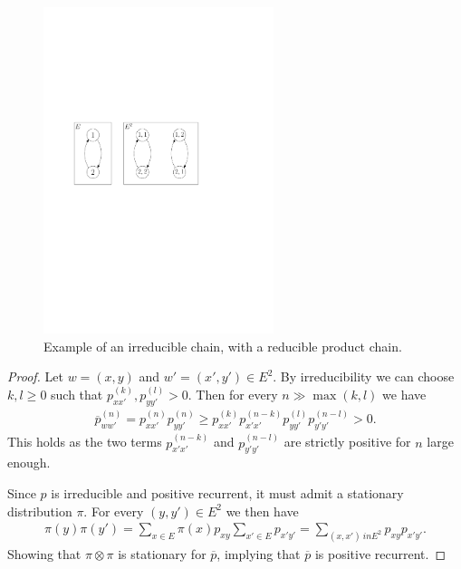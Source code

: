 \begin{figure}[h!]
\centering
\includegraphics[width=0.6\textwidth]{figures/non_irred_prod_chain.pdf}
\caption{Example of an irreducible chain, with a reducible product chain.}
\end{figure}

\begin{proof}
	Let $w=(x,y)$ and $w'=(x',y') \in E^2$. By irreducibility we can choose $k,l\geq 0$ such that $p_{xx'}^{(k)}, p_{yy'}^{(l)} >0$. Then for every $n \gg \max(k,l)$ we have
\begin{align}
	\overline{p}_{ww'}^{(n)} = p_{xx'}^{(n)}p_{yy'}^{(n)} \geq p_{xx'}^{(k)}p_{x'x'}^{(n-k)} p_{yy'}^{(l)} p_{y'y'}^{(n-l)} > 0.
\end{align}
This holds as the two terms $p_{x'x'}^{(n-k)}$ and $p_{y'y'}^{(n-l)}$ are strictly positive for $n$ large enough.

	Since $p$ is irreducible and positive recurrent, it must admit a stationary distribution $\pi $. For every $(y,y')\in E^2$ we then have
\begin{align}
	\pi (y) \pi (y') = \sum_{x \in E}^{} \pi(x)p_{xy} \sum_{x' \in E}^{}p_{x'y'} = \sum_{(x,x')\ in E^2}^{} p_{xy}p_{x'y'}. 
\end{align}
Showing that $\pi \otimes \pi $ is stationary for $\overline{p}$, implying that $\overline{p}$ is positive recurrent.
\end{proof}

